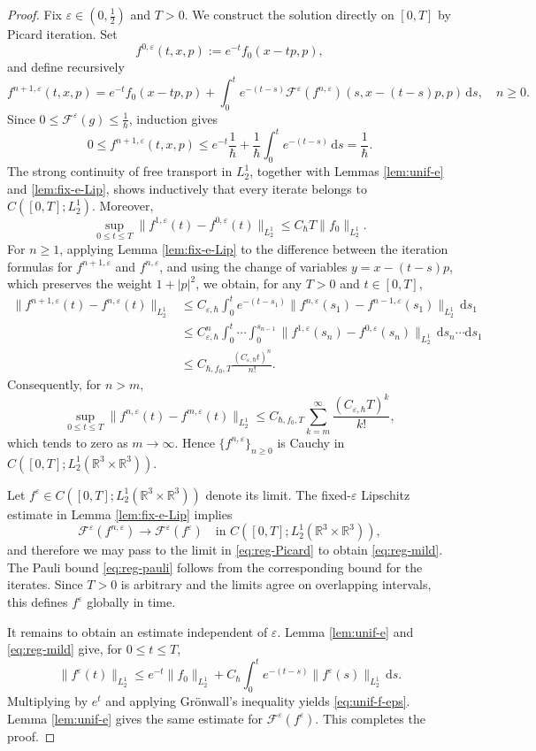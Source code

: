 \documentclass[10pt,reqno]{amsart}
\numberwithin{equation}{section}
\theoremstyle{definition}
\newcommand{\R}{\mathbb R}
\newcommand{\ds}{\mathrm{d}s}
\newcommand{\e}{\varepsilon}
\newcommand{\calF}{\mathcal F}
\newcommand{\bq}{\begin{equation}}
\newcommand{\eq}{\end{equation}}
\begin{document}
\begin{proof}
Fix $\e\in(0,\frac12)$ and $T>0$. We construct the solution directly on $[0,T]$ by Picard iteration. Set
\[
 f^{0,\e}(t,x,p):=e^{-t}f_0(x-tp,p),
\]
and define recursively
\bq \label{eq:reg-Picard}
 f^{n+1,\e}(t,x,p) =e^{-t}f_0(x-tp,p) +\int_0^t e^{-(t-s)}  \calF^\e(f^{n,\e})(s,x-(t-s)p,p)\,\ds,  \quad n\geq0.
\eq
Since $0\leq\calF^\e(g)\leq\frac1\hbar $, induction gives
\[
 0\leq f^{n+1,\e}(t,x,p) \leq e^{-t}\frac1\hbar   +\frac1\hbar \int_0^t e^{-(t-s)}\,\ds =\frac1\hbar .
\]
The strong continuity of free transport in $L^1_2$, together with Lemmas \ref{lem:unif-e} and \ref{lem:fix-e-Lip}, shows inductively that every iterate belongs to $C([0,T];L^1_2)$. Moreover,
\[
 \sup_{0\leq t\leq T}\|f^{1,\e}(t)-f^{0,\e}(t)\|_{L^1_2} \leq C_\hbar T\|f_0\|_{L^1_2}.
\]
For $n\geq1$, applying Lemma \ref{lem:fix-e-Lip} to the difference between the iteration formulas for $f^{n+1,\e}$ and $f^{n,\e}$, and using the change of variables $y=x-(t-s)p$, which preserves the weight $1+|p|^2$, we obtain, for any $T>0$ and $t\in[0,T]$,
	\begin{align*}
		\|f^{n+1,\e}(t)-f^{n,\e}(t)\|_{L^1_2}&\leq C_{\e,\hbar}\int_0^t e^{-(t-s_1)}  \|f^{n,\e}(s_1)-f^{n-1,\e}(s_1)\|_{L^1_2}\,\ds_1 \\
		&\leq C_{\e,\hbar}^n\int_0^t\cdots \int_0^{s_{n-1}}   \|f^{1,\e}(s_n)-f^{0,\e}(s_n)\|_{L^1_2}\,\ds_n\cdots \ds_1 \\
		&\le C_{\hbar,f_0,T}\frac{\left(C_{\e,\hbar}t\right)^n}{n!}.
	\end{align*}
Consequently, for $n>m$,
\[
 \sup_{0\le t\le T}  \|f^{n,\e}(t)-f^{m,\e}(t)\|_{L^1_2}  \le C_{\hbar,f_0,T} \sum_{k=m}^{\infty}\frac{(C_{\e,\hbar}T)^k}{k!},
\]
which tends to zero as $m\to\infty$. Hence $\{f^{n,\e}\}_{n\ge0}$ is Cauchy in $C([0,T];L^1_2(\R^3\times\R^3))$.

Let $f^\e\in C([0,T];L^1_2(\R^3\times\R^3))$ denote its limit. The fixed-$\e$ Lipschitz estimate in Lemma \ref{lem:fix-e-Lip} implies
\[
 \calF^\e(f^{n,\e})\to\calF^\e(f^\e)  \quad\text{in }C([0,T];L^1_2(\R^3\times\R^3)),
\]
and therefore we may pass to the limit in \eqref{eq:reg-Picard} to obtain \eqref{eq:reg-mild}. The Pauli bound \eqref{eq:reg-pauli} follows from the corresponding bound for the iterates. Since $T>0$ is arbitrary and the limits agree on overlapping intervals, this defines $f^\e$ globally in time.

It remains to obtain an estimate independent of $\e$.  Lemma \ref{lem:unif-e} and \eqref{eq:reg-mild} give, for $0\leq t\leq T$,
\[
 \|f^\e(t)\|_{L^1_2}  \leq e^{-t}\|f_0\|_{L^1_2}  +C_\hbar\int_0^t e^{-(t-s)}\|f^\e(s)\|_{L^1_2}\,\ds.
\]
Multiplying by $e^t$ and applying Gr\"onwall's inequality yields \eqref{eq:unif-f-eps}.  Lemma \ref{lem:unif-e} gives the same estimate for $\calF^\e(f^\e)$. This completes the proof.
\end{proof}
\end{document}
